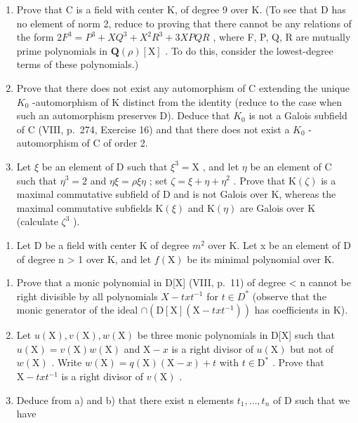 \begin{enumerate}
\def\labelenumi{\alph{enumi})}
\item
  Prove that C is a field with center K, of degree 9 over K. (To see that D has no element of norm 2, reduce to proving that there cannot be any relations of the form \(2F^{3} = P^{3} + XQ^{3} + X^{2}R^{3} + 3XPQR\) , where F, P, Q, R are mutually prime polynomials in \(\mathbf{Q}(\rho)[\mathrm{X}]\) . To do this, consider the lowest-degree terms of these polynomials.)
\item
  Prove that there does not exist any automorphism of C extending the unique \(K_{0}\) -automorphism of K distinct from the identity (reduce to the case when such an automorphism preserves D). Deduce that \(K_{0}\) is not a Galois subfield of C (VIII, p.~274, Exercise 16) and that there does not exist a \(K_{0}\) -automorphism of C of order 2.
\item
  Let \(\xi\) be an element of D such that \(\xi^3 = \mathrm{X}\) , and let \(\eta\) be an element of C such that \(\eta^3 = 2\) and \(\eta \xi = \rho \xi \eta\) ; set \(\zeta = \xi + \eta + \eta^2\) . Prove that \(\mathrm{K}(\zeta)\) is a maximal commutative subfield of D and is not Galois over K, whereas the maximal commutative subfields \(\mathrm{K}(\xi)\) and \(\mathrm{K}(\eta)\) are Galois over K (calculate \(\zeta^3\) ).
\end{enumerate}

\begin{enumerate}
\def\labelenumi{\arabic{enumi})}
\setcounter{enumi}{5}
\tightlist
\item
  Let D be a field with center K of degree \(m^{2}\) over K. Let x be an element of D of degree n \textgreater{} 1 over K, and let \(f(\mathrm{X})\) be its minimal polynomial over K.
\end{enumerate}

\begin{enumerate}
\def\labelenumi{\alph{enumi})}
\item
  Prove that a monic polynomial in D{[}X{]} (VIII, p.~11) of degree \textless{} n cannot be right divisible by all polynomials \(X - txt^{-1}\) for \(t \in D^{*}\) (observe that the monic generator of the ideal \(\cap(\mathrm{D}[\mathrm{X}](\mathrm{X}-txt^{-1}))\) has coefficients in K).
\item
  Let \(u(\mathrm{X}), v(\mathrm{X}), w(\mathrm{X})\) be three monic polynomials in D{[}X{]} such that \(u(\mathrm{X}) = v(\mathrm{X})w(\mathrm{X})\) and \(\mathrm{X} - x\) is a right divisor of \(u(\mathrm{X})\) but not of \(w(\mathrm{X})\) . Write \(w(\mathrm{X}) = q(\mathrm{X})(\mathrm{X} - x) + t\) with \(t \in \mathrm{D}^*\) . Prove that \(\mathrm{X} - txt^{-1}\) is a right divisor of \(v(\mathrm{X})\) .
\item
  Deduce from a) and b) that there exist n elements \(t_{1},\ldots,t_{n}\) of D such that we have
\end{enumerate}

